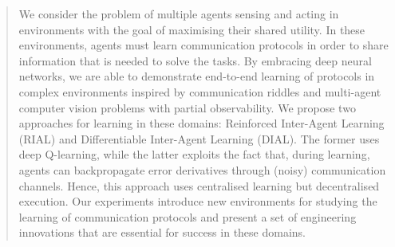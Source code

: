 \begin{abstract}
We consider the problem of multiple agents sensing and acting in environments with the goal of maximising their shared utility. In these environments, agents must learn communication protocols in order to share information that is needed to solve the tasks. By embracing deep neural networks, we are able to demonstrate end-to-end learning of protocols in complex environments inspired by communication riddles and multi-agent computer vision problems with partial observability. We propose two approaches for learning in these domains: Reinforced Inter-Agent Learning (RIAL) and Differentiable Inter-Agent Learning (DIAL). The former uses deep Q-learning, while the latter exploits the fact that, during learning, agents can backpropagate error derivatives through (noisy) communication channels. Hence, this approach uses centralised learning but decentralised execution. Our experiments introduce new environments for studying the learning of communication protocols and present a set of engineering innovations that are essential for success in these domains.  
\end{abstract}